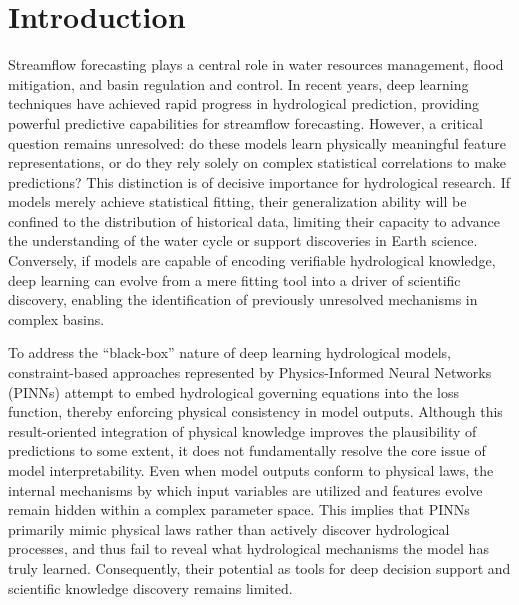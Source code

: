 \section{Introduction}
Streamflow forecasting plays a central role in water resources management, flood mitigation, and basin regulation and control\cite{GAO2026103148}. In recent years, deep learning techniques have achieved rapid progress in hydrological prediction\cite{milly2020colorado}, providing powerful predictive capabilities for streamflow forecasting\cite{apak2026multi,ZIPPER2026134909}. However, a critical question remains unresolved: do these models learn physically meaningful feature representations, or do they rely solely on complex statistical correlations to make predictions\cite{Núñez2023_XAI}? This distinction is of decisive importance for hydrological research. If models merely achieve statistical fitting, their generalization ability will be confined to the distribution of historical data, limiting their capacity to advance the understanding of the water cycle or support discoveries in Earth science. Conversely, if models are capable of encoding verifiable hydrological knowledge, deep learning can evolve from a mere fitting tool into a driver of scientific discovery\cite{MardShap2022}, enabling the identification of previously unresolved mechanisms in complex basins.

To address the “black-box” nature of deep learning hydrological models, constraint-based approaches represented by Physics-Informed Neural Networks (PINNs)\cite{SHI2025_PINN} attempt to embed hydrological governing equations into the loss function\cite{SCHMID2026124819}, thereby enforcing physical consistency in model outputs\cite{LIU2026_PINN}. Although this result-oriented integration of physical knowledge improves the plausibility of predictions to some extent, it does not fundamentally resolve the core issue of model interpretability\cite{Roscher2020_Explainable}. Even when model outputs conform to physical laws, the internal mechanisms by which input variables are utilized and features evolve remain hidden within a complex parameter space\cite{Krishnapriyan2021_PINN}. This implies that PINNs primarily mimic physical laws rather than actively discover hydrological processes\cite{NASER2026_Inrter}, and thus fail to reveal what hydrological mechanisms the model has truly learned. Consequently, their potential as tools for deep decision support and scientific knowledge discovery remains limited.

